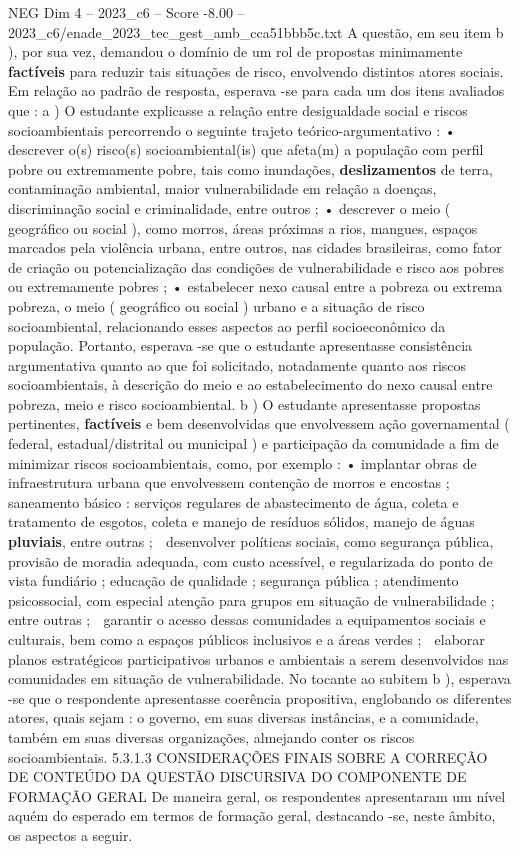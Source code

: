 \begin{textsample}{NEG Dim 4 – 2023\_c6 – Score -8.00 – 2023\_c6/enade\_2023\_tec\_gest\_amb\_cca51bbb5c.txt}
A questão, em seu item b ), por sua vez, demandou o domínio de um rol de propostas minimamente \textbf{factíveis} para reduzir tais situações de risco, envolvendo distintos atores sociais.
Em relação ao padrão de resposta, esperava -se para cada um dos itens avaliados que : a ) O estudante explicasse a relação entre desigualdade social e riscos socioambientais percorrendo o seguinte trajeto teórico-argumentativo : • descrever o(s) risco(s) socioambiental(is) que afeta(m) a população com perfil pobre ou extremamente pobre, tais como inundações, \textbf{deslizamentos} de terra, contaminação ambiental, maior vulnerabilidade em relação a doenças, discriminação social e criminalidade, entre outros ; • descrever o meio ( geográfico ou social ), como morros, áreas próximas a rios, mangues, espaços marcados pela violência urbana, entre outros, nas cidades brasileiras, como fator de criação ou potencialização das condições de vulnerabilidade e risco aos pobres ou extremamente pobres ; • estabelecer nexo causal entre a pobreza ou extrema pobreza, o meio ( geográfico ou social ) urbano e a situação de risco socioambiental, relacionando esses aspectos ao perfil socioeconômico da população.
Portanto, esperava -se que o estudante apresentasse consistência argumentativa quanto ao que foi solicitado, notadamente quanto aos riscos socioambientais, à descrição do meio e ao estabelecimento do nexo causal entre pobreza, meio e risco socioambiental. b ) O estudante apresentasse propostas pertinentes, \textbf{factíveis} e bem desenvolvidas que envolvessem ação governamental ( federal, estadual/distrital ou municipal ) e participação da comunidade a fim de minimizar riscos socioambientais, como, por exemplo : • implantar obras de infraestrutura urbana que envolvessem contenção de morros e encostas ; saneamento básico : serviços regulares de abastecimento de água, coleta e tratamento de esgotos, coleta e manejo de resíduos sólidos, manejo de águas \textbf{pluviais}, entre outras ;  desenvolver políticas sociais, como segurança pública, provisão de moradia adequada, com custo acessível, e regularizada do ponto de vista fundiário ; educação de qualidade ; segurança pública ; atendimento psicossocial, com especial atenção para grupos em situação de vulnerabilidade ; entre outras ;  garantir o acesso dessas comunidades a equipamentos sociais e culturais, bem como a espaços públicos inclusivos e a áreas verdes ;  elaborar planos estratégicos participativos urbanos e ambientais a serem desenvolvidos nas comunidades em situação de vulnerabilidade.
No tocante ao subitem b ), esperava -se que o respondente apresentasse coerência propositiva, englobando os diferentes atores, quais sejam : o governo, em suas diversas instâncias, e a comunidade, também em suas diversas organizações, almejando conter os riscos socioambientais. 5.3.1.3 CONSIDERAÇÕES FINAIS SOBRE A CORREÇÃO DE CONTEÚDO DA QUESTÃO DISCURSIVA DO COMPONENTE DE FORMAÇÃO GERAL De maneira geral, os respondentes apresentaram um nível aquém do esperado em termos de formação geral, destacando -se, neste âmbito, os aspectos a seguir.

\end{textsample}
